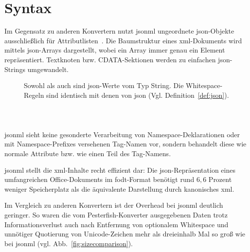 \section{Syntax}
\label{sec:jsonml-syntax}

Im Gegensatz zu anderen Konvertern nutzt \acrshort{jsonml} ungeordnete \acrshort{json}-Objekte ausschließlich für Attributlisten~\cite{jsonmlsyntax}. Die Baumstruktur eines \acrshort{xml}-Dokuments wird mittels \acrshort{json}-Arrays dargestellt, wobei ein Array immer genau ein Element repräsentiert. Textknoten bzw. CDATA-Sektionen werden zu einfachen \acrshort{json}-Strings umgewandelt.

\begin{figure}[H]
    \begin{definition}
        \label{def:jsonml}
        Sowohl  als auch  sind \acrshort{json}-Werte vom Typ String. Die Whitespace-Regeln sind identisch mit denen von \acrshort{json} (Vgl. Definition~\ref{def:json}).
        \begin{grammar}
            
        \end{grammar}
    \end{definition}
\end{figure}

\begin{figure}[h]
    \begin{example}~
    \inputminted{json}{xmltree.json}
    \label{fig:xmltreejsonml}
    \end{example}
\end{figure}

\acrshort{jsonml} sieht keine gesonderte Verarbeitung von Namespace-Deklarationen oder mit Namespace-Prefixes versehenen Tag-Namen vor, sondern behandelt diese wie normale Attribute bzw. wie einen Teil des Tag-Namens.

\acrshort{jsonml} stellt die \acrshort{xml}-Inhalte recht effizient dar: Die \acrshort{json}-Repräsentation eines umfangreichen Office-Dokuments im \acrshort{fodt}-Format benötigt rund $6,6$ Prozent weniger Speicherplatz als die äquivalente Darstellung durch kanonisches \acrshort{xml}.

Im Vergleich zu anderen Konvertern ist der Overhead bei \acrshort{jsonml} deutlich geringer. So waren die vom Pesterfish-Konverter ausgegebenen Daten trotz Informationsverlust auch nach Entfernung von optionalem Whitespace und unnötiger Quotierung von Unicode-Zeichen mehr als dreieinhalb Mal so groß wie bei \acrshort{jsonml} (vgl. Abb.~\ref{fig:sizecomparison}).

